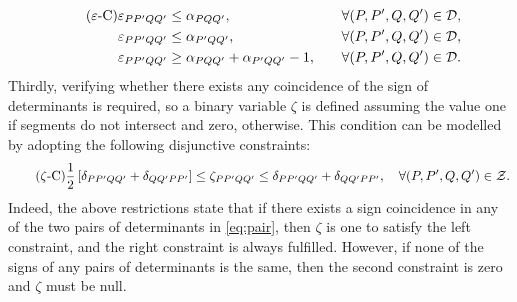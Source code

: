 \documentclass[a4paper,  review, authoryear, 1p.]{elsarticle}
\newcommand{\VB}{{V^{}_{\mathcal B}}}
\newcommand{\CV}[1]{{\color{blue}#1}}
\begin{document}
		\begin{align*}\tag{$\varepsilon$-C}\label{eq:varepsilonC}
			\varepsilon_{PP'QQ'} & \leq \alpha_{PQQ'},&\quad\forall (P,P',Q,Q')\in\mathcal D,\\
			\varepsilon_{PP'QQ'} & \leq \alpha_{P'QQ'},&\quad\forall (P,P',Q,Q')\in\mathcal D,\\
			\varepsilon_{PP'QQ'} & \geq \alpha_{PQQ'} + \alpha_{P'QQ'} - 1,&\quad\forall (P,P',Q,Q')\in\mathcal D.
		\end{align*}
	\newcommand{\zetacheck}[4]{\zeta_{#1#2#3#4}}
	Thirdly, verifying whether there exists any coincidence of the sign of determinants is required, so a binary variable $\zeta$ is defined  assuming the value one if segments do not intersect and zero, otherwise. This condition can be modelled by adopting the following disjunctive constraints:
	\begin{equation*}\tag{$\zeta$-C}\label{eq:zetaC}
		\frac{1}{2}\left[\deltamas{P}{P'}{Q}{Q'}+\deltamas{Q}{Q'}{P}{P'}\right]\leq\zetacheck{P}{P'}{Q}{Q'}\leq \deltamas{P}{P'}{Q}{Q'}+\deltamas{Q}{Q'}{P}{P'},\quad\forall (P,P',Q,Q')\in \mathcal Z.
	\end{equation*}
	Indeed, the above restrictions state that if there exists a sign coincidence in any of the two pairs of determinants in \eqref{eq:pair}, then $\zeta$ is one to satisfy the left constraint, and the right constraint is always fulfilled. However, if none of the signs of any pairs of determinants is the same, then the second constraint is zero and $\zeta$ must be null.
	
\end{document}
